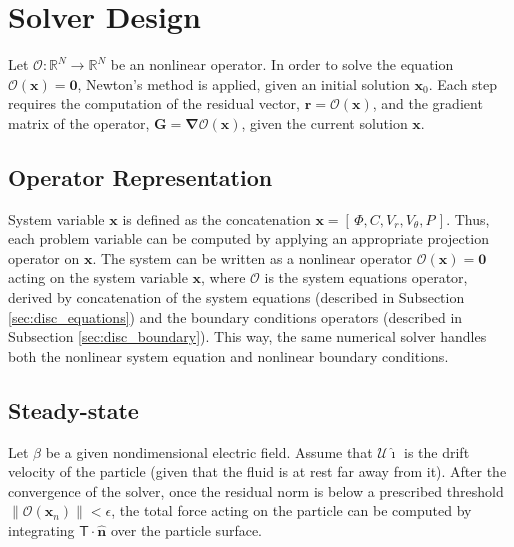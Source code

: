 \documentclass[MSc,beforeExam]{iitcsthesis}
\newcommand{\R}{\ensuremath{\mathbb{R}}}
\newcommand\bnabla{\boldsymbol{\nabla}}
\newcommand\bn{\boldsymbol{\hat{n}}}
\newcommand\bG{\boldsymbol{G}}
\newcommand\bx{\boldsymbol{x}}
\newcommand\br{\boldsymbol{r}}
\newcommand\bzero{\boldsymbol{0}}
\newcommand\cO{\mathcal{O}}
\newcommand\cU{\mathscr{U}}
\newcommand\tT{\mathsf{T}}
\newcommand\ui{\boldsymbol{\hat{\imath}}}
\begin{document}
\section{Solver Design}
Let $\cO : \R^N \rightarrow \R^N $ be an nonlinear operator.
In order to solve the equation $\cO(\bx) = \bzero$, Newton's method is applied, 
given an initial solution $\bx_0$.
Each step requires the computation of the residual vector, $\br = \cO(\bx)$, and
the gradient matrix of the operator, $\bG = \bnabla \cO(\bx)$, 
given the current solution $\bx$.

\subsection{Operator Representation}
System variable $\bx$ is defined as the concatenation $\bx = [\,\varPhi, C, V_r, V_\theta, P\,]$.
Thus, each problem variable can be computed by applying an appropriate projection operator on $\bx$.
The system can be written as a nonlinear operator $\cO(\bx) = \bzero$ 
acting on the system variable ${\bx}$, 
where $\cO$ is the system equations operator, 
derived by concatenation of the system equations (described in Subsection \ref{sec:disc_equations})
and the boundary conditions operators (described in Subsection \ref{sec:disc_boundary}).
This way, the same numerical solver handles both the nonlinear system equation and nonlinear
boundary conditions.

\subsection{Steady-state}
Let $\beta$ be a given nondimensional electric field.
Assume that $\cU \ui$ is the drift velocity of the particle 
(given that the fluid is at rest far away from it).
After the convergence of the solver, once the residual norm is below
a prescribed threshold $\|\cO(\bx_n)\| < \epsilon$, 
the total force acting on the particle  
can be computed by integrating $\tT \cdot \bn$ over the particle surface.
\end{document}
